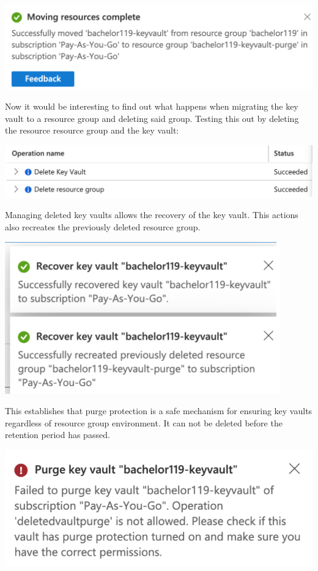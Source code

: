\includegraphics[scale=0.5]{figures/migrate-resource-success.png}

Now it would be interesting to find out what happens when migrating the key vault to a resource group and deleting said group. Testing this out by deleting the resource resource group and the key vault:

\includegraphics[scale=0.5]{figures/delete-group.png}

Managing deleted key vaults allows the recovery of the key vault. This actions also recreates the previously deleted resource group.

\includegraphics[scale=1.3]{figures/recover-vault.png}

This establishes that purge protection is a safe mechanism for ensuring key vaults regardless of resource group environment. It can not be deleted before the retention period has passed.

\includegraphics[scale=.8]{figures/purge-denied.png}

